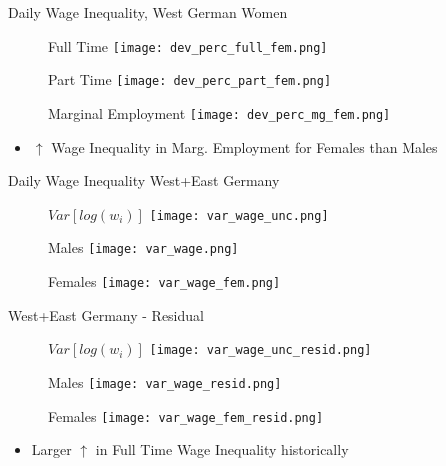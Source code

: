 \documentclass[hyperref={bookmarks=false}]{beamer}
\begin{document}
\begin{appendix}
\begin{frame}{Daily Wage Inequality, West German Women}
\begin{figure}[!t]
\centering
\begin{minipage}[b]{0.32\textwidth}{Full Time}
\centering
\texttt{[image: dev\_perc\_full\_fem.png]}
\end{minipage}
\begin{minipage}[b]{0.32\textwidth}{Part Time}
\centering
\texttt{[image: dev\_perc\_part\_fem.png]}
\end{minipage}
\begin{minipage}[b]{0.32\textwidth}{Marginal Employment}
\centering
\texttt{[image: dev\_perc\_mg\_fem.png]}
\end{minipage}
\end{figure}
\begin{itemize}
\setlength{\itemsep}{0.7 cm}
\item $\uparrow$ Wage Inequality in Marg. Employment for Females than Males
\end{itemize}
\end{frame}

\begin{frame}{Daily Wage Inequality}
West+East Germany
\begin{figure}[!t]
\begin{minipage}[b]{0.32\textwidth}{$Var[log(w_i)]$}
\centering
\texttt{[image: var\_wage\_unc.png]}
\end{minipage}
\begin{minipage}[b]{0.32\textwidth}{Males}
\centering
\texttt{[image: var\_wage.png]}
\end{minipage}
\begin{minipage}[b]{0.32\textwidth}{Females}
\centering
\texttt{[image: var\_wage\_fem.png]}
\end{minipage}
\end{figure}
West+East Germany - Residual
\begin{figure}[!t]
\begin{minipage}[b]{0.32\textwidth}{$Var[log(w_i)]$}
\centering
\texttt{[image: var\_wage\_unc\_resid.png]}
\end{minipage}
\begin{minipage}[b]{0.32\textwidth}{Males}
\centering
\texttt{[image: var\_wage\_resid.png]}
\end{minipage}
\begin{minipage}[b]{0.32\textwidth}{Females}
\centering
\texttt{[image: var\_wage\_fem\_resid.png]}
\end{minipage}
\end{figure}
\begin{itemize}
\item  Larger $\uparrow$ in Full Time Wage Inequality historically \hyperlink{DATA}{}
\end{itemize}
\end{frame}


\end{appendix}
\end{document}
